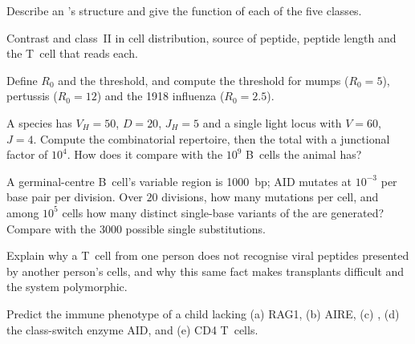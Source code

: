 \begin{exercise}[$\star$]\label{exo:b3:adaptive-immunity:2}
Describe an 's structure and give the function of each of the
five classes.
\end{exercise}

\begin{exercise}[$\star$]\label{exo:b3:adaptive-immunity:3}
Contrast  and class~II in cell distribution, source of
peptide, peptide length and the T~cell that reads each.
\end{exercise}

\begin{exercise}[$\star$]\label{exo:b3:adaptive-immunity:4}
Define $R_{0}$ and the  threshold, and compute the
threshold for mumps ($R_{0} = 5$), pertussis ($R_{0} = 12$) and the
1918 influenza ($R_{0} = 2.5$).
\end{exercise}

\begin{exercise}[$\star\star$]\label{exo:b3:adaptive-immunity:5}
A species has $V_{H} = 50$, $D = 20$, $J_{H} = 5$ and a single light
locus with $V = 60$, $J = 4$. Compute the combinatorial repertoire, then
the total with a junctional factor of $10^{4}$. How does it compare
with the $10^{9}$ B~cells the animal has?
\end{exercise}

\begin{exercise}[$\star\star$]\label{exo:b3:adaptive-immunity:6}
A germinal-centre B~cell's variable region is \qty{1000}{bp}; AID mutates
at $10^{-3}$ per base pair per division. Over $20$ divisions, how many
mutations per cell, and among $10^{5}$ cells how many distinct
single-base variants of the  are generated? Compare with the
$3000$ possible single substitutions.
\end{exercise}

\begin{exercise}[$\star\star$]\label{exo:b3:adaptive-immunity:7}
Explain why a T~cell from one person does not recognise viral peptides
presented by another person's cells, and why this same fact makes
transplants difficult and the  system polymorphic.
\end{exercise}

\begin{exercise}[$\star\star$]\label{exo:b3:adaptive-immunity:8}
Predict the immune phenotype of a child lacking (a) RAG1, (b) AIRE,
(c) , (d) the class-switch enzyme AID, and (e) CD4 T~cells.
\end{exercise}

